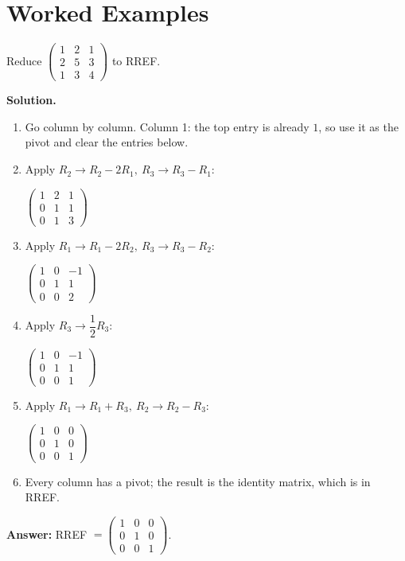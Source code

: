 \documentclass[11pt]{article}
\begin{document}
\newpage
\section*{\large\color{ink} Worked Examples}
\begin{tcolorbox}[breakable,colback=white,colframe=ink!60,title={\bfseries Example 1 \textperiodcentered\ Reducing a matrix to RREF}]Reduce $\begin{pmatrix}1 & 2 & 1 \\ 2 & 5 & 3 \\ 1 & 3 & 4\end{pmatrix}$ to RREF.
\par\smallskip
\textbf{Solution.} \begin{enumerate}[leftmargin=1.6em,itemsep=1pt,topsep=2pt,label=\arabic*.]\item Go column by column. Column 1: the top entry is already $1$, so use it as the pivot and clear the entries below.
\item Apply $R_2\to R_2-2R_1,\ R_3\to R_3-R_1$:\par\smallskip $\displaystyle \begin{pmatrix}1 & 2 & 1 \\ 0 & 1 & 1 \\ 0 & 1 & 3\end{pmatrix}$
\item Apply $R_1\to R_1-2R_2,\ R_3\to R_3-R_2$:\par\smallskip $\displaystyle \begin{pmatrix}1 & 0 & -1 \\ 0 & 1 & 1 \\ 0 & 0 & 2\end{pmatrix}$
\item Apply $R_3\to \dfrac{1}{2} R_3$:\par\smallskip $\displaystyle \begin{pmatrix}1 & 0 & -1 \\ 0 & 1 & 1 \\ 0 & 0 & 1\end{pmatrix}$
\item Apply $R_1\to R_1+R_3,\ R_2\to R_2-R_3$:\par\smallskip $\displaystyle \begin{pmatrix}1 & 0 & 0 \\ 0 & 1 & 0 \\ 0 & 0 & 1\end{pmatrix}$
\item Every column has a pivot; the result is the identity matrix, which is in RREF.
\end{enumerate}\textbf{Answer:} RREF $=\begin{pmatrix}1 & 0 & 0 \\ 0 & 1 & 0 \\ 0 & 0 & 1\end{pmatrix}$.
\end{tcolorbox}
\end{document}
